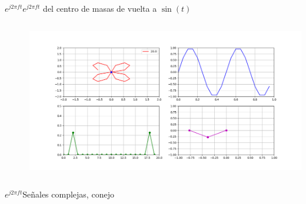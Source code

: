 \begin{frame}{$e^{j2\pi ft}$}{$e^{j2\pi ft}$ del centro de masas de vuelta a $\sin(t)$}
   \handsonicon
   \begin{columns}[c]
      \hspace{2pt}
      \begin{column}{.3\textwidth}
         
      \end{column}
      \hspace{2pt}
      \vrule
      \hspace{2pt}
      \begin{column}{.3\textwidth}
         
      \end{column}
      \hspace{2pt}
      \vrule
      \hspace{2pt}
      \begin{column}{.4\textwidth}
         \centering\includegraphics[width=1.0\textwidth]{3_clase/euler5}
      \end{column}
      \hspace{2pt}
   \end{columns}
   \vfill
\end{frame}
\begin{frame}{$e^{j2\pi ft}$}{Señales complejas, conejo}
   \handsonicon
   \begin{columns}[c]
      \hspace{2pt}
      \begin{column}{.5\textwidth}
         
      \end{column}
      \hspace{2pt}
      \vrule
      \hspace{2pt}
      \begin{column}{.5\textwidth}
         
      \end{column}
   \end{columns}
   \vfill
\end{frame}
